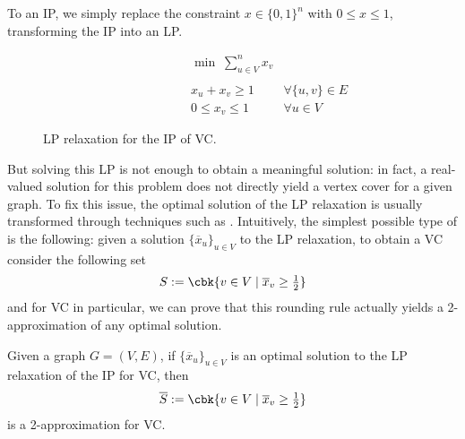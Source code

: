 \documentclass[a4paper, 12pt]{report}
\begin{document}
    To  an IP, we simply replace the constraint $x \in \{0, 1\}^n$ with $0 \le x \le 1$, transforming the IP into an LP.

    \begin{figure}[H]
        \centering
        \[\begin{array}{ccl}
            \qquad\qquad\quad
            & \min \; \displaystyle \sum_{u \in V}^n {x_v} \\\\
            & x_u + x_v \ge 1 & \forall \{u, v\} \in E \\
            & 0 \le x_v \le 1 & \forall u \in V
        \end{array}\]
        \caption{LP relaxation for the IP of VC.}
    \end{figure}

    But solving this LP is not enough to obtain a meaningful solution: in fact, a real-valued solution for this problem does not directly yield a vertex cover for a given graph. To fix this issue, the optimal solution of the LP relaxation is usually transformed through techniques such as . Intuitively, the simplest possible type of  is the following: given a solution $\{\overline x_u\}_{u \in V}$ to the LP relaxation, to obtain a VC consider the following set $$S := \cbk{v \in V \mid \overline x_v \ge \tfrac{1}{2}}$$ and for VC in particular, we can prove that this rounding rule actually yields a 2-approximation of any optimal solution.

    \begin{framedthm}[label={lp 2-approx vc}]{}
        Given a graph $G = (V, E)$, if $\{\overline x_u\}_{u \in V}$ is an optimal solution to the LP relaxation of the IP for VC, then $$\overline S := \cbk{v \in V \mid \overline x_v \ge \tfrac{1}{2}}$$ is a 2-approximation for VC.
    \end{framedthm}
\end{document}
